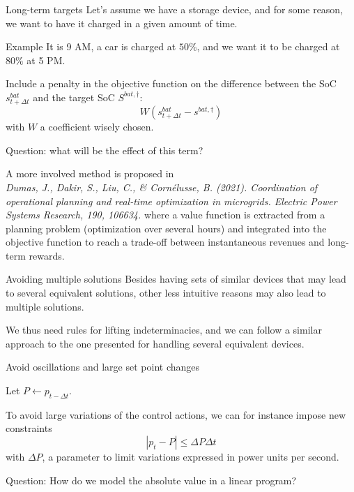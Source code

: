 \begin{frame}[allowframebreaks]{Long-term targets}
    Let's assume we have a storage device, and for some reason, we want to have it charged in a given amount of time.
    \begin{block}{Example}
        It is 9 AM, a car is charged at $50\%$, and we want it to be charged at $80\%$ at 5 PM.
    \end{block}

    Include a penalty in the objective function on the difference between the SoC $s^{bat}_{t+\Delta t}$ and the target SoC $S^{bat, \dagger}$:
    $$W (s^{bat}_{t+\Delta t} - s^{bat, \dagger})$$
    with $W$ a coefficient wisely chosen.

    Question: what will be the effect of this term?

    A more involved method is proposed in \\
    \textit{Dumas, J., Dakir, S., Liu, C., \& Cornélusse, B. (2021). Coordination of operational planning and real-time optimization in microgrids. Electric Power Systems Research, 190, 106634.}
    where a value function is extracted from a planning problem (optimization over several hours) and integrated into the objective function to reach a trade-off between instantaneous revenues and long-term rewards.
\end{frame}




\begin{frame}{Avoiding multiple solutions}
    Besides having sets of similar devices that may lead to several equivalent solutions, other less intuitive reasons may also lead to multiple solutions.

    We thus need rules for lifting indeterminacies, and we can follow a similar approach to the one presented for handling several equivalent devices.
\end{frame}

\begin{frame} {Avoid oscillations and large set point changes} 

    Let $P \leftarrow p_{t-\Delta t}$.
    
    To avoid large variations of the control actions, we can for instance impose new constraints 
    $$| p_t - P| \leq \Delta P \Delta t$$
    with $\Delta P$, a parameter to limit variations expressed in power units per second.

    Question: How do we model the absolute value in a linear program?
\end{frame}


